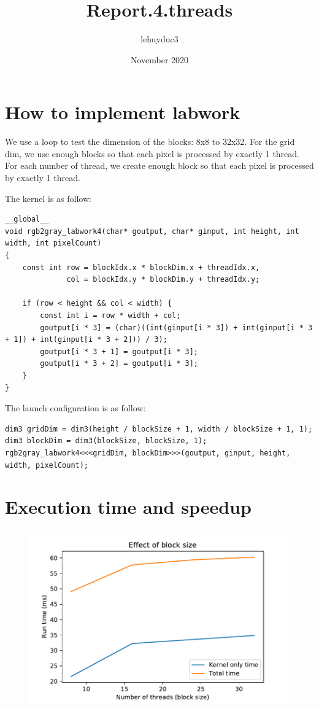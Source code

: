 \documentclass[14pt]{article}
\title{Report.4.threads}
\author{lehuyduc3 }
\date{November 2020}
\begin{document}
\maketitle

\section{How to implement labwork}
We use a loop to test the dimension of the blocks: 8x8 to 32x32.
For the grid dim, we use enough blocks so that each pixel is processed by exactly 1 thread.
For each number of thread, we create enough block so that each pixel is processed by exactly 1 thread.

The kernel is as follow:
\begin{lstlisting}
__global__
void rgb2gray_labwork4(char* goutput, char* ginput, int height, int width, int pixelCount)
{
	const int row = blockIdx.x * blockDim.x + threadIdx.x,
			  col = blockIdx.y * blockDim.y + threadIdx.y;
	
	if (row < height && col < width) {
		const int i = row * width + col;
		goutput[i * 3] = (char)((int(ginput[i * 3]) + int(ginput[i * 3 + 1]) + int(ginput[i * 3 + 2])) / 3);
        goutput[i * 3 + 1] = goutput[i * 3];
        goutput[i * 3 + 2] = goutput[i * 3];
	}			  
}
\end{lstlisting}

The launch configuration is as follow:
\begin{lstlisting}
dim3 gridDim = dim3(height / blockSize + 1, width / blockSize + 1, 1);
dim3 blockDim = dim3(blockSize, blockSize, 1);
rgb2gray_labwork4<<<gridDim, blockDim>>>(goutput, ginput, height, width, pixelCount);
\end{lstlisting}

\section{Execution time and speedup}

\begin{figure}[H]
\centering
\includegraphics{report4_runtime.pdf}
\end{figure}
\end{document}
